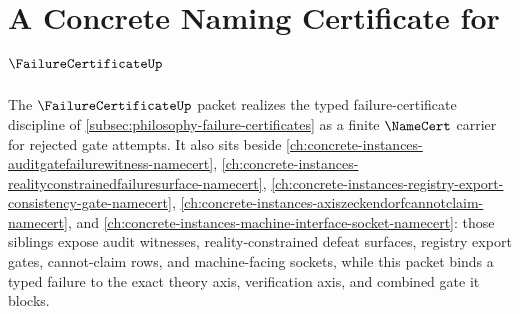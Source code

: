\chapter{A Concrete Naming Certificate for $\FailureCertificateUp$}
\label{ch:concrete-instances-failurecertificate-namecert}

The $\FailureCertificateUp$ packet realizes the typed failure-certificate discipline of \autoref{subsec:philosophy-failure-certificates} as a finite $\NameCert$ carrier for rejected gate attempts. It also sits beside \autoref{ch:concrete-instances-auditgatefailurewitness-namecert}, \autoref{ch:concrete-instances-realityconstrainedfailuresurface-namecert}, \autoref{ch:concrete-instances-registry-export-consistency-gate-namecert}, \autoref{ch:concrete-instances-axiszeckendorfcannotclaim-namecert}, and \autoref{ch:concrete-instances-machine-interface-socket-namecert}: those siblings expose audit witnesses, reality-constrained defeat surfaces, registry export gates, cannot-claim rows, and machine-facing sockets, while this packet binds a typed failure to the exact theory axis, verification axis, and combined gate it blocks.

